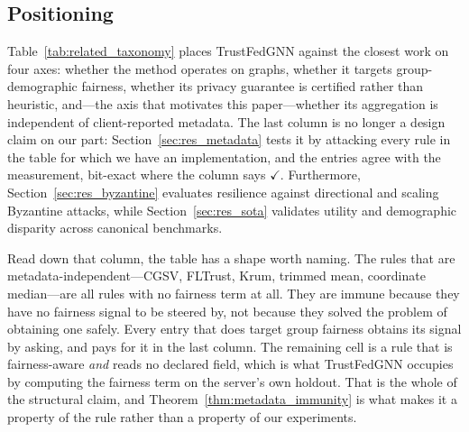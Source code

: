 \documentclass[preprint,12pt]{elsarticle}
\theoremstyle{plain}
\theoremstyle{definition}
\theoremstyle{remark}
\begin{document}
\subsection{Positioning}
Table~\ref{tab:related_taxonomy} places TrustFedGNN against the closest work on four axes: whether the method operates on graphs, whether it targets group-demographic fairness, whether its privacy guarantee is certified rather than heuristic, and---the axis that motivates this paper---whether its aggregation is independent of client-reported metadata. The last column is no longer a design claim on our part: Section~\ref{sec:res_metadata} tests it by attacking every rule in the table for which we have an implementation, and the entries agree with the measurement, bit-exact where the column says $\checkmark$. Furthermore, Section~\ref{sec:res_byzantine} evaluates resilience against directional and scaling Byzantine attacks, while Section~\ref{sec:res_sota} validates utility and demographic disparity across canonical benchmarks.

Read down that column, the table has a shape worth naming. The rules that are metadata-independent---CGSV, FLTrust, Krum, trimmed mean, coordinate median---are all rules with no fairness term at all. They are immune because they have no fairness signal to be steered by, not because they solved the problem of obtaining one safely. Every entry that does target group fairness obtains its signal by asking, and pays for it in the last column. The remaining cell is a rule that is fairness-aware \emph{and} reads no declared field, which is what TrustFedGNN occupies by computing the fairness term on the server's own holdout. That is the whole of the structural claim, and Theorem~\ref{thm:metadata_immunity} is what makes it a property of the rule rather than a property of our experiments.
\end{document}
